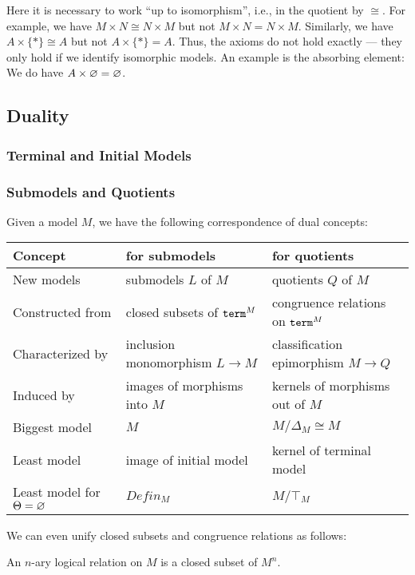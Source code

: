 Here it is necessary to work ``up to isomorphism'', i.e., in the quotient by $\cong$.
For example, we have $M\times N \cong N\times M$ but not $M\times N=N\times M$.
Similarly, we have $A\times \{\ast\}\cong A$ but not $A\times \{\ast\}=A$.
Thus, the axioms do not hold exactly --- they only hold if we identify isomorphic models.
An example is the absorbing element: We do have $A\times \varnothing=\varnothing$.

\subsection{Duality}\label{sec:univ:meta:dual}

\subsubsection{Terminal and Initial Models}\label{sec:univ:meta:terminit}

\subsubsection{Submodels and Quotients}\label{sec:univ:meta:subquot}

Given a model $M$, we have the following correspondence of dual concepts:

\begin{center}
\begin{tabular}{|l||l|l|}
\hline
Concept & for submodels & for quotients \\
\hline
\hline
New models & submodels $L$ of $M$ & quotients $Q$ of $M$ \\
Constructed from & closed subsets of $\mathtt{term}^M$ & congruence relations on $\mathtt{term}^M$ \\
Characterized by & inclusion monomorphism $L\to M$ & classification epimorphism $M\to Q$ \\
Induced by & images of morphisms into $M$ & kernels of morphisms out of $M$ \\
Biggest model & $M$ & $M/\Delta_M\cong M$ \\
Least model & image of initial model & kernel of terminal model \\
Least model for $\Theta=\varnothing$ & $Defin_M$ & $M/\top_M$ \\
\hline
\end{tabular}
\end{center}

We can even unify closed subsets and congruence relations as follows:
\begin{definition}
An $n$-ary logical relation on $M$ is a closed subset of $M^n$.
\end{definition}

